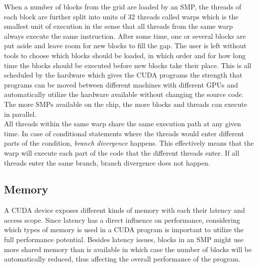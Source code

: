 When a number of blocks from the grid are loaded by an SMP, the threads of each block are further split into units of 32 threads called warps which is the smallest unit of execution in the sense that all threads from the same warp always execute the same instruction. After some time, one or several blocks are put aside and leave room for new blocks to fill the gap. The user is left without tools to choose which blocks should be loaded, in which order and for how long time the blocks should be executed before new blocks take their place. This is all scheduled by the hardware which gives the CUDA programs the strength that programs can be moved between different machines with different GPUs and automatically utilize the hardware available without changing the source code. The more SMPs available on the chip, the more blocks and threads can execute in parallel. \\

All threads within the same warp share the same execution path at any given time. In case of conditional statements where the threads would enter different parts of the condition, \emph{branch divergence} happens. This effectively means that the warp will execute each part of the code that the different threads enter. If all threads enter the same branch, branch divergence does not happen.

\subsection{Memory}
A CUDA device exposes different kinds of memory with each their latency and access scope. Since latency has a direct influence on performance, considering which types of memory is used in a CUDA program is important to utilize the full performance potential. Besides latency issues, blocks in an SMP might use more shared memory than is available in which case the number of blocks will be automatically reduced, thus affecting the overall performance of the program. \\

